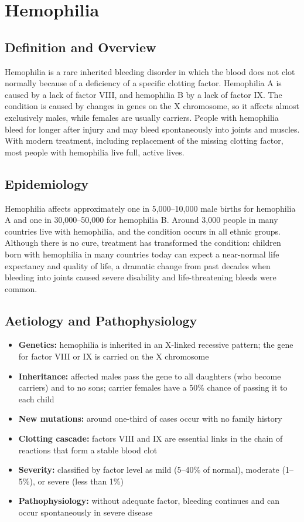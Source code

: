 \chapter{Hemophilia}

\section*{Definition and Overview}
Hemophilia is a rare inherited bleeding disorder in which the blood does not clot normally because of a deficiency of a specific clotting factor. Hemophilia A is caused by a lack of factor VIII, and hemophilia B by a lack of factor IX. The condition is caused by changes in genes on the X chromosome, so it affects almost exclusively males, while females are usually carriers. People with hemophilia bleed for longer after injury and may bleed spontaneously into joints and muscles. With modern treatment, including replacement of the missing clotting factor, most people with hemophilia live full, active lives.

\section*{Epidemiology}
Hemophilia affects approximately one in 5,000--10,000 male births for hemophilia A and one in 30,000--50,000 for hemophilia B. Around 3,000 people in many countries live with hemophilia, and the condition occurs in all ethnic groups. Although there is no cure, treatment has transformed the condition: children born with hemophilia in many countries today can expect a near-normal life expectancy and quality of life, a dramatic change from past decades when bleeding into joints caused severe disability and life-threatening bleeds were common.

\section*{Aetiology and Pathophysiology}
\begin{itemize}
    \item \textbf{Genetics:} hemophilia is inherited in an X-linked recessive pattern; the gene for factor VIII or IX is carried on the X chromosome
    \item \textbf{Inheritance:} affected males pass the gene to all daughters (who become carriers) and to no sons; carrier females have a 50\% chance of passing it to each child
    \item \textbf{New mutations:} around one-third of cases occur with no family history
    \item \textbf{Clotting cascade:} factors VIII and IX are essential links in the chain of reactions that form a stable blood clot
    \item \textbf{Severity:} classified by factor level as mild (5--40\% of normal), moderate (1--5\%), or severe (less than 1\%)
    \item \textbf{Pathophysiology:} without adequate factor, bleeding continues and can occur spontaneously in severe disease
\end{itemize}

